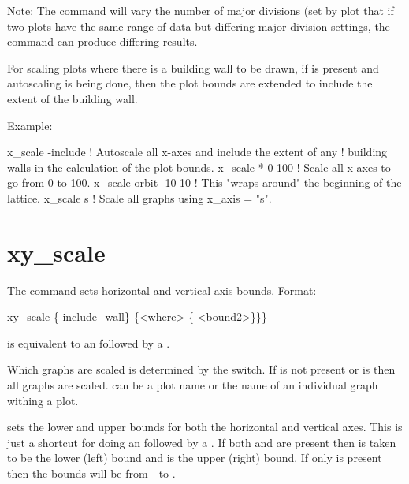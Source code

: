 {{{{{{{{{{{{Note: The  command will vary the number of major divisions (set by
plot%
that if two plots have the same range of data but differing major division settings, the
 command can produce differing results.

For scaling  plots where there is a building wall to be drawn, if 
is present and autoscaling is being done, then the plot bounds are extended to include the extent of
the building wall.

Example:
\begin{example}
  x_scale -include      ! Autoscale all x-axes and include the extent of any 
                        !   building walls in the calculation of the plot bounds.
  x_scale * 0 100       ! Scale all x-axes to go from 0 to 100.
  x_scale orbit -10 10  ! This "wraps around" the beginning of the lattice.
  x_scale s             ! Scale all graphs using x_axis = "s".
\end{example}


\section{xy_scale}
\label{s:xy.scale}

The  command sets horizontal and vertical axis bounds. Format:
\begin{example}
  xy_scale \{-include_wall\} \{<where> \{<bound1> <bound2>\}\}\}
\end{example}

 is equivalent to an  followed by a .

Which graphs are scaled is determined by the  switch. If  is not present or
 is \vn{*} then all graphs are scaled.  can be a plot name or the name of an
individual graph withing a plot.

 sets the lower and upper bounds for both the horizontal and vertical axes.  This is
just a shortcut for doing an  followed by a .  If both  and
 are present then  is taken to be the lower (left) bound and 
is the upper (right) bound. If only  is present then the bounds will be from
- to .

}}}}}}}}}}}}
